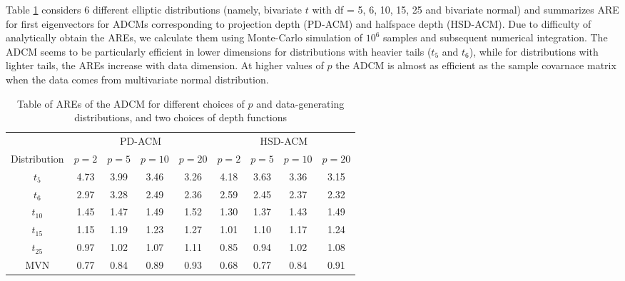 \documentclass[12pt,letterpaper]{article}
\theoremstyle{definition} \newtheorem{Definition}[Theorem]{Definition}
\begin{document}
Table \ref{table:AREtable} considers 6 different elliptic distributions (namely, bivariate $t$ with df = 5, 6, 10, 15, 25 and bivariate normal) and summarizes ARE for first eigenvectors for ADCMs corresponding to projection depth (PD-ACM) and halfspace depth (HSD-ACM). Due to difficulty of analytically obtain the AREs, we calculate them using Monte-Carlo simulation of $10^6$ samples and subsequent numerical integration. The ADCM seems to be particularly efficient in lower dimensions for distributions with heavier tails ($t_5$ and $t_6$), while for distributions with lighter tails, the AREs increase with data dimension. At higher values of $p$ the ADCM is almost as efficient as the sample covarnace matrix when the data comes from multivariate normal distribution.

\begin{table}[t]
    \begin{tabular}{c|cccc|cccc}
    \hline
    & \multicolumn{4}{c|}{PD-ACM} & \multicolumn{4}{c}{HSD-ACM} \\\cline{2-9}
    Distribution & $p=2$  & $p=5$  & $p=10$ & $p=20$ & $p=2$  & $p=5$  & $p=10$ & $p=20$ \\ \hline
    $t_5$           & 4.73 & 3.99 & 3.46 & 3.26 & 4.18 & 3.63 & 3.36 & 3.15 \\
    $t_6$           & 2.97 & 3.28 & 2.49 & 2.36 & 2.59 & 2.45 & 2.37 & 2.32 \\
    $t_{10}$          & 1.45 & 1.47 & 1.49 & 1.52 & 1.30 & 1.37 & 1.43 & 1.49 \\
    $t_{15}$          & 1.15 & 1.19 & 1.23 & 1.27 & 1.01 & 1.10 & 1.17 & 1.24 \\
    $t_{25}$          & 0.97 & 1.02 & 1.07 & 1.11 & 0.85 & 0.94 & 1.02 & 1.08 \\
    MVN          & 0.77 & 0.84 & 0.89 & 0.93 & 0.68 & 0.77 & 0.84 & 0.91 \\ \hline
    \end{tabular}
    \caption{Table of AREs of the ADCM for different choices of $p$ and data-generating distributions, and two choices of depth functions}
    \label{table:AREtable}
\end{table}
\end{document}
